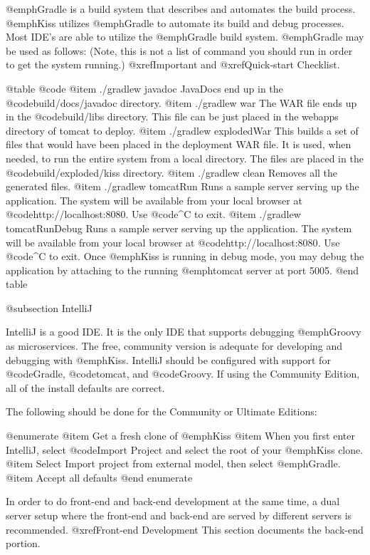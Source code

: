 @emph{Gradle} is a build system that describes and automates the build process.
@emph{Kiss} utilizes @emph{Gradle} to automate its build and debug processes.
Most IDE's are able to utilize the @emph{Gradle} build system.
@emph{Gradle} may be used as follows:
(Note, this is not a list of command you should run in order to get the system running.) 
@xref{Important} and @xref{Quick-start Checklist}.

@table @code
@item ./gradlew javadoc
JavaDocs end up in the @code{build/docs/javadoc} directory.
@item ./gradlew war
The WAR file ends up in the @code{build/libs} directory.  
This file can be just placed in the webapps directory of tomcat to deploy.
@item ./gradlew explodedWar
This builds a set of files that would have been placed in the deployment WAR file.  It is used, when needed,
to run the entire system from a local directory.  The files are placed in the @code{build/exploded/kiss}
directory.
@item ./gradlew clean
Removes all the generated files.
@item ./gradlew tomcatRun
Runs a sample server serving up the application.  The system will be
available from your local browser at
@code{http://localhost:8080}.  Use @code{^C} to exit.
@item ./gradlew tomcatRunDebug
Runs a sample server serving up the application.  The system will be
available from your local browser at
@code{http://localhost:8080}.  Use @code{^C} to exit. Once @emph{Kiss} is running in debug mode,
you may debug the application by attaching to the running @emph{tomcat} server at port 5005.
@end table

@subsection IntelliJ

IntelliJ is a good IDE.  It is the only IDE that supports debugging
@emph{Groovy} as microservices.  The free, community version is adequate for developing
and debugging with @emph{Kiss}.  IntelliJ should be configured with
support for @code{Gradle}, @code{tomcat}, and @code{Groovy}.  If using the Community Edition, all of the install defaults are correct. 

The following should be done for the Community or Ultimate Editions:

@enumerate
@item
Get a fresh clone of @emph{Kiss}
@item
When you first enter IntelliJ, select @code{Import Project} and select the root of your @emph{Kiss} clone.
@item
Select Import project from external model, then select @emph{Gradle}.
@item
Accept all defaults
@end enumerate

In order to do front-end and back-end development at the same time, a dual server setup where
the front-end and back-end are served by different servers is recommended.  @xref{Front-end Development}
This section documents the back-end portion.

